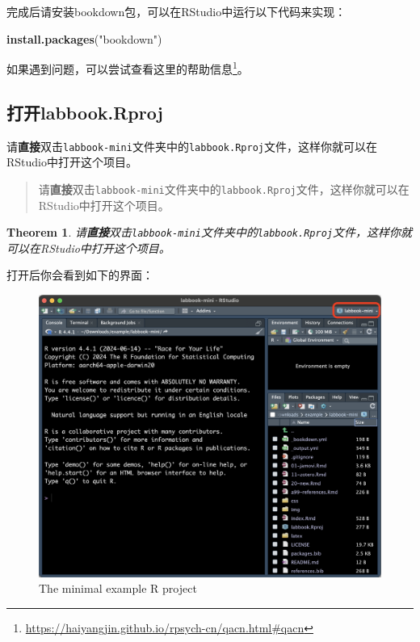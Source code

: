 \documentclass[]{ctexbook}
\newenvironment{Shaded}{\begin{snugshade}}{\end{snugshade}}
\newcommand{\FunctionTok}[1]{\textcolor[rgb]{0.13,0.29,0.53}{\textbf{#1}}}
\newcommand{\NormalTok}[1]{#1}
\newcommand{\StringTok}[1]{\textcolor[rgb]{0.31,0.60,0.02}{#1}}
\renewcommand{\href}[2]{#2\footnote{\url{#1}}}
\newtheorem{theorem}{Theorem}[chapter]
\theoremstyle{definition}
\theoremstyle{definition}
\theoremstyle{definition}
\theoremstyle{definition}
\theoremstyle{remark}
\begin{document}
完成后请安装bookdown包，可以在RStudio中运行以下代码来实现：

\begin{Shaded}
\begin{Highlighting}[]
\FunctionTok{install.packages}\NormalTok{(}\StringTok{"bookdown"}\NormalTok{)}
\end{Highlighting}
\end{Shaded}

如果遇到问题，可以尝试查看这里的\href{https://haiyangjin.github.io/rpsych-cn/qacn.html\#qacn}{帮助信息}。

\subsection{打开labbook.Rproj}\label{ux6253ux5f00labbook.rproj}

请\textbf{直接}双击\texttt{labbook-mini}文件夹中的\texttt{labbook.Rproj}文件，这样你就可以在RStudio中打开这个项目。

\begin{quote}
请\textbf{直接}双击\texttt{labbook-mini}文件夹中的\texttt{labbook.Rproj}文件，这样你就可以在RStudio中打开这个项目。
\end{quote}

\begin{theorem}
请\textbf{直接}双击\texttt{labbook-mini}文件夹中的\texttt{labbook.Rproj}文件，这样你就可以在RStudio中打开这个项目。
\end{theorem}

打开后你会看到如下的界面：

\begin{figure}

{\centering \includegraphics[width=0.9\linewidth]{img/contribute/mini_rproj} 

}

\caption{The minimal example R project}\label{fig:contri-mini-rproj}
\end{figure}
\end{document}
